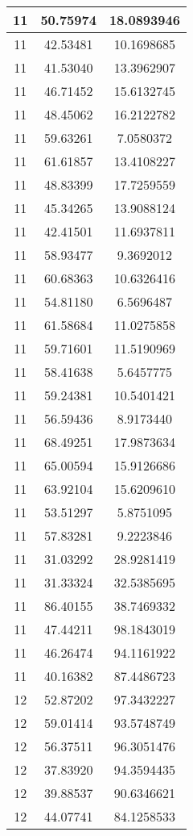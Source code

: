 \documentclass[
]{book}
\begin{document}
\begin{tabular}{c|c|c}
\hline
11 & 50.75974 & 18.0893946\\
\hline
11 & 42.53481 & 10.1698685\\
\hline
11 & 41.53040 & 13.3962907\\
\hline
11 & 46.71452 & 15.6132745\\
\hline
11 & 48.45062 & 16.2122782\\
\hline
11 & 59.63261 & 7.0580372\\
\hline
11 & 61.61857 & 13.4108227\\
\hline
11 & 48.83399 & 17.7259559\\
\hline
11 & 45.34265 & 13.9088124\\
\hline
11 & 42.41501 & 11.6937811\\
\hline
11 & 58.93477 & 9.3692012\\
\hline
11 & 60.68363 & 10.6326416\\
\hline
11 & 54.81180 & 6.5696487\\
\hline
11 & 61.58684 & 11.0275858\\
\hline
11 & 59.71601 & 11.5190969\\
\hline
11 & 58.41638 & 5.6457775\\
\hline
11 & 59.24381 & 10.5401421\\
\hline
11 & 56.59436 & 8.9173440\\
\hline
11 & 68.49251 & 17.9873634\\
\hline
11 & 65.00594 & 15.9126686\\
\hline
11 & 63.92104 & 15.6209610\\
\hline
11 & 53.51297 & 5.8751095\\
\hline
11 & 57.83281 & 9.2223846\\
\hline
11 & 31.03292 & 28.9281419\\
\hline
11 & 31.33324 & 32.5385695\\
\hline
11 & 86.40155 & 38.7469332\\
\hline
11 & 47.44211 & 98.1843019\\
\hline
11 & 46.26474 & 94.1161922\\
\hline
11 & 40.16382 & 87.4486723\\
\hline
12 & 52.87202 & 97.3432227\\
\hline
12 & 59.01414 & 93.5748749\\
\hline
12 & 56.37511 & 96.3051476\\
\hline
12 & 37.83920 & 94.3594435\\
\hline
12 & 39.88537 & 90.6346621\\
\hline
12 & 44.07741 & 84.1258533\\

\end{tabular}
\end{document}
